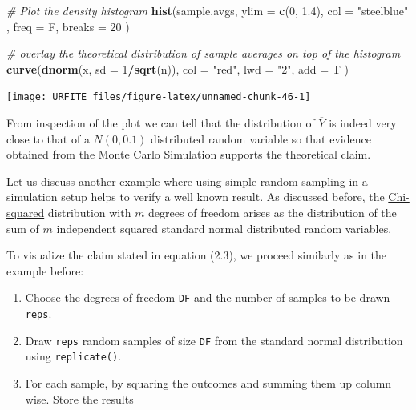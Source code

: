 \documentclass[]{book}
\newenvironment{Shaded}{\begin{snugshade}}{\end{snugshade}}
\newcommand{\KeywordTok}[1]{\textcolor[rgb]{0.13,0.29,0.53}{\textbf{#1}}}
\newcommand{\DataTypeTok}[1]{\textcolor[rgb]{0.13,0.29,0.53}{#1}}
\newcommand{\DecValTok}[1]{\textcolor[rgb]{0.00,0.00,0.81}{#1}}
\newcommand{\FloatTok}[1]{\textcolor[rgb]{0.00,0.00,0.81}{#1}}
\newcommand{\StringTok}[1]{\textcolor[rgb]{0.31,0.60,0.02}{#1}}
\newcommand{\CommentTok}[1]{\textcolor[rgb]{0.56,0.35,0.01}{\textit{#1}}}
\newcommand{\OperatorTok}[1]{\textcolor[rgb]{0.81,0.36,0.00}{\textbf{#1}}}
\newcommand{\NormalTok}[1]{#1}
\providecommand{\tightlist}{%
  \setlength{\itemsep}{0pt}\setlength{\parskip}{0pt}}
\theoremstyle{definition}
\theoremstyle{definition}
\theoremstyle{definition}
\theoremstyle{remark}
\begin{document}
\begin{Shaded}
\begin{Highlighting}[]
\CommentTok{# Plot the density histogram}
\KeywordTok{hist}\NormalTok{(sample.avgs, }
     \DataTypeTok{ylim =} \KeywordTok{c}\NormalTok{(}\DecValTok{0}\NormalTok{, }\FloatTok{1.4}\NormalTok{), }
     \DataTypeTok{col =} \StringTok{"steelblue"}\NormalTok{ , }
     \DataTypeTok{freq =}\NormalTok{ F, }
     \DataTypeTok{breaks =} \DecValTok{20}
\NormalTok{     )}

\CommentTok{# overlay the theoretical distribution of sample averages on top of the histogram}
\KeywordTok{curve}\NormalTok{(}\KeywordTok{dnorm}\NormalTok{(x, }\DataTypeTok{sd =} \DecValTok{1}\OperatorTok{/}\KeywordTok{sqrt}\NormalTok{(n)), }
      \DataTypeTok{col =} \StringTok{"red"}\NormalTok{, }
      \DataTypeTok{lwd =} \StringTok{"2"}\NormalTok{, }
      \DataTypeTok{add =}\NormalTok{ T}
\NormalTok{      )}
\end{Highlighting}
\end{Shaded}

\begin{center}\texttt{[image: URFITE\_files/figure-latex/unnamed-chunk-46-1]} \end{center}

From inspection of the plot we can tell that the distribution of
\(\overline{Y}\) is indeed very close to that of a \(N(0, 0.1)\)
distributed random variable so that evidence obtained from the Monte
Carlo Simulation supports the theoretical claim.

Let us discuss another example where using simple random sampling in a
simulation setup helps to verify a well known result. As discussed
before, the \protect\hyperlink{chisquare}{Chi-squared} distribution with
\(m\) degrees of freedom arises as the distribution of the sum of \(m\)
independent squared standard normal distributed random variables.

To visualize the claim stated in equation (2.3), we proceed similarly as
in the example before:

\begin{enumerate}
\def\labelenumi{\arabic{enumi}.}
\tightlist
\item
  Choose the degrees of freedom \texttt{DF} and the number of samples to
  be drawn \texttt{reps}.
\item
  Draw \texttt{reps} random samples of size \texttt{DF} from the
  standard normal distribution using \texttt{replicate()}.
\item
  For each sample, by squaring the outcomes and summing them up column
  wise. Store the results
\end{enumerate}
\end{document}
